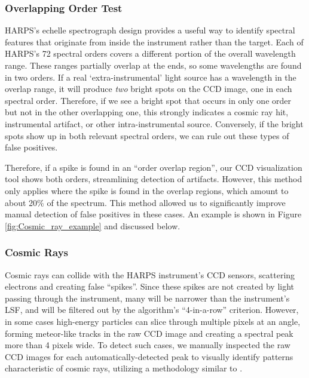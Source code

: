 \documentclass[twocolumn]{aastex701}
\begin{document}
\subsubsection{Overlapping Order Test}
\label{s:overlapping_orders}
HARPS's echelle spectrograph design provides a useful way to identify spectral features that originate from inside the instrument rather than the target.  Each of HARPS's 72 spectral orders covers a different portion of the overall wavelength range. These ranges partially overlap at the ends, so some wavelengths are found in two orders.  If a real `extra-instrumental' light source has a wavelength in the overlap range, it will produce \emph{two} bright spots on the CCD image, one in each spectral order. Therefore, if we see a bright spot that occurs in only one order but not in the other overlapping one, this strongly indicates a cosmic ray hit, instrumental artifact, or other intra-instrumental source.  Conversely, if the bright spots show up in both relevant spectral orders, we can rule out these types of false positives.

Therefore, if a spike is found in an \enquote{order overlap region}, our CCD visualization tool shows both orders, streamlining detection of artifacts.  However, this method only applies  where the spike is found in the overlap regions, which amount to about 20\% of the spectrum.  This method allowed us to significantly improve manual detection of false positives in these cases.  An example is shown in Figure \ref{fig:Cosmic_ray_example} and discussed below.

\subsubsection{Cosmic Rays}
\label{s:cosmic}
Cosmic rays can collide with the HARPS instrument's CCD sensors, scattering electrons and creating false \enquote{spikes}. Since these spikes are not created by light passing through the instrument, many will be narrower than the instrument's LSF, and will be filtered out by the algorithm's \enquote{4-in-a-row} criterion.  However, in some cases high-energy particles can slice through multiple pixels at an angle, forming meteor-like tracks in the raw CCD image and creating a spectral peak more than 4 pixels wide.  To detect such cases, we manually inspected the raw CCD images for each automatically-detected peak to visually identify patterns characteristic of cosmic rays, utilizing a methodology similar to \cite{Tellis_2017}. 
\end{document}
